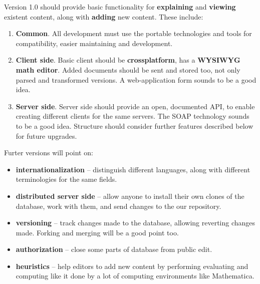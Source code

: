 \documentclass{article}
\begin{document}
Version 1.0 should provide basic functionality for {\bf explaining}
and {\bf viewing} existent content, along with {\bf adding} new
content. These include:

\begin{enumerate}
\item
{\bf Common}. All development must use the portable technologies and
tools for compatibility, easier maintaining and development.
\item
{\bf Client side}. Basic client should be {\bf crossplatform}, has a
{\bf WYSIWYG math editor}. Added documents should be sent and stored
too, not only parsed and transformed versions. A web-application
form sounds to be a good idea.
\item
{\bf Server side}. Server side should provide an open, documented
API, to enable creating different clients for the same servers. The
SOAP technology sounds to be a good idea. Structure should consider
further features described below for future upgrades.
\end{enumerate}

Furter versions will point on:
\begin{itemize}
\item {\bf internationalization} -- distinguish different
languages, along with different terminologies for the same fields.
\item {\bf distributed server side} -- allow anyone to install their own
clones of the database, work with them, and send changes to the our
repository.
\item {\bf versioning} -- track changes made to the database,
allowing reverting changes made. Forking and merging will be a good
point too.
\item {\bf authorization} -- close some parts of database from public
edit.
\item {\bf heuristics} -- help editors to add new content by
performing evaluating and computing like it done by a lot of
computing environments like Mathematica\circledR.

\end{itemize}
\end{document}
